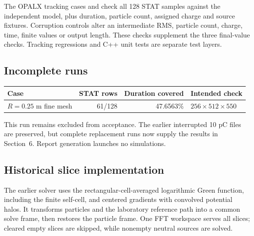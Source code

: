 The OPALX tracking cases  and
 check all 128 STAT samples against the independent
model, plus duration, particle count, assigned charge and source fixtures.
Corruption controls alter an intermediate RMS, particle count, charge, time,
finite values or output length. These checks supplement the three final-value
 checks. Tracking regressions and C++ unit tests are separate test layers.

\subsection{Incomplete runs}
\begin{center}\small
\begin{tabular}{lrrl}\toprule
Case & STAT rows & Duration covered & Intended check\\\midrule
$R=0.25$ m fine mesh & 61/128 & 47.6563\% & $256\times512\times550$\\\bottomrule
\end{tabular}
\end{center}
This run remains excluded from acceptance. The earlier interrupted 10 pC
files are preserved, but complete replacement runs now supply the results in
Section~6. Report generation launches no simulations.

\subsection{Historical slice implementation}
The earlier solver uses the rectangular-cell-averaged logarithmic Green function,
including the finite self-cell, and centered gradients with convolved potential
halos. It transforms particles and the laboratory reference path into a common
solve frame, then restores the particle frame. One FFT workspace serves all
slices; cleared empty slices are skipped, while nonempty neutral sources are solved.



